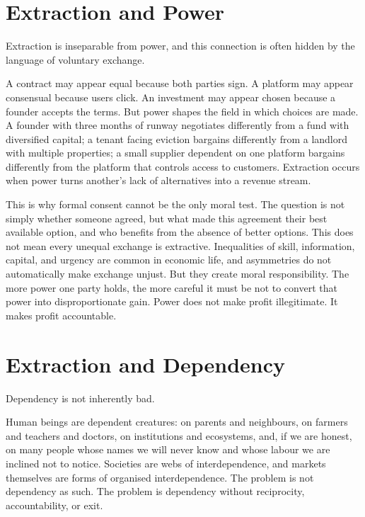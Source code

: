 \documentclass[11pt,a4paper,oneside]{book}
\begin{document}
\section*{Extraction and Power}

Extraction is inseparable from power, and this connection is often hidden by the language of voluntary exchange.

A contract may appear equal because both parties sign. A platform may appear consensual because users click. An investment may appear chosen because a founder accepts the terms. But power shapes the field in which choices are made. A founder with three months of runway negotiates differently from a fund with diversified capital; a tenant facing eviction bargains differently from a landlord with multiple properties; a small supplier dependent on one platform bargains differently from the platform that controls access to customers. Extraction occurs when power turns another's lack of alternatives into a revenue stream.

This is why formal consent cannot be the only moral test. The question is not simply whether someone agreed, but what made this agreement their best available option, and who benefits from the absence of better options. This does not mean every unequal exchange is extractive. Inequalities of skill, information, capital, and urgency are common in economic life, and asymmetries do not automatically make exchange unjust. But they create moral responsibility. The more power one party holds, the more careful it must be not to convert that power into disproportionate gain. Power does not make profit illegitimate. It makes profit accountable.

\section*{Extraction and Dependency}

Dependency is not inherently bad.

Human beings are dependent creatures: on parents and neighbours, on farmers and teachers and doctors, on institutions and ecosystems, and, if we are honest, on many people whose names we will never know and whose labour we are inclined not to notice. Societies are webs of interdependence, and markets themselves are forms of organised interdependence. The problem is not dependency as such. The problem is dependency without reciprocity, accountability, or exit.
\end{document}
